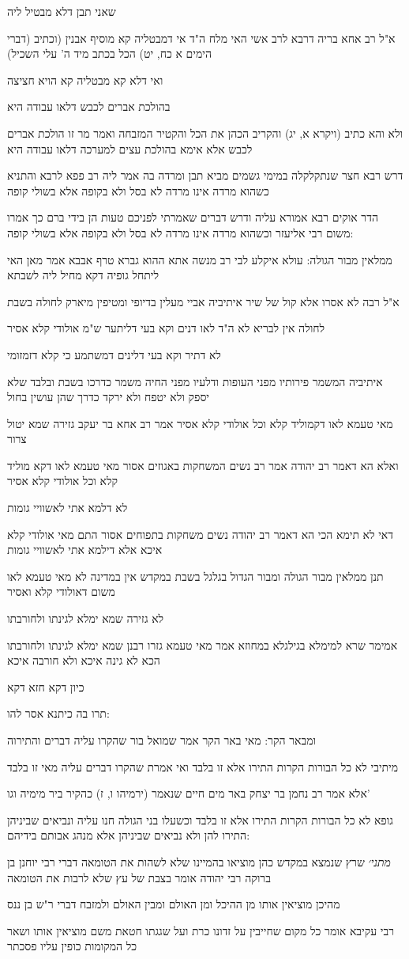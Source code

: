 \documentclass[12pt, openany]{book}
\newcommand{\sethebfont}{
\fontsize{10.5pt}{21.0pt} \selectfont
}
\newcommand{\textblock}[1]{
{\sethebfont #1\\}	
}
\begin{document}
\textblock{שאני תבן דלא מבטיל ליה}
\textblock{א"ל רב אחא בריה דרבא לרב אשי האי מלח ה"ד אי דמבטליה קא מוסיף אבנין (וכתיב (דברי הימים א כח, יט) הכל בכתב מיד ה' עלי השכיל)}
\textblock{ואי דלא קא מבטליה קא הויא חציצה}
\textblock{בהולכת אברים לכבש דלאו עבודה היא}
\textblock{ולא והא כתיב (ויקרא א, יג) והקריב הכהן את הכל והקטיר המזבחה ואמר מר זו הולכת אברים לכבש אלא אימא בהולכת עצים למערכה דלאו עבודה היא}
\textblock{דרש רבא חצר שנתקלקלה במימי גשמים מביא תבן ומרדה בה אמר ליה רב פפא לרבא והתניא כשהוא מרדה אינו מרדה לא בסל ולא בקופה אלא בשולי קופה}
\textblock{הדר אוקים רבא אמורא עליה ודרש דברים שאמרתי לפניכם טעות הן בידי ברם כך אמרו משום רבי אליעזר וכשהוא מרדה אינו מרדה לא בסל ולא בקופה אלא בשולי קופה:}
\textblock{ממלאין מבור הגולה: עולא איקלע לבי רב מנשה אתא ההוא גברא טרף אבבא אמר מאן האי ליתחל גופיה דקא מחיל ליה לשבתא}
\textblock{א"ל רבה לא אסרו אלא קול של שיר איתיביה אביי מעלין בדיופי ומטיפין מיארק לחולה בשבת}
\textblock{לחולה אין לבריא לא ה"ד לאו דנים וקא בעי דליתער ש"מ אולודי קלא אסיר}
\textblock{לא דתיר וקא בעי דלינים דמשתמע כי קלא דזמזומי}
\textblock{איתיביה המשמר פירותיו מפני העופות ודלעיו מפני החיה משמר כדרכו בשבת ובלבד שלא יספק ולא יטפח ולא ירקד כדרך שהן עושין בחול}
\textblock{מאי טעמא לאו דקמוליד קלא וכל אולודי קלא אסיר אמר רב אחא בר יעקב גזירה שמא יטול צרור}
\textblock{ואלא הא דאמר רב יהודה אמר רב נשים המשחקות באגוזים אסור מאי טעמא לאו דקא מוליד קלא וכל אולודי קלא אסיר}
\textblock{לא דלמא אתי לאשוויי גומות}
\textblock{דאי לא תימא הכי הא דאמר רב יהודה נשים משחקות בתפוחים אסור התם מאי אולודי קלא איכא אלא דילמא אתי לאשוויי גומות}
\textblock{תנן ממלאין מבור הגולה ומבור הגדול בגלגל בשבת במקדש אין במדינה לא מאי טעמא לאו משום דאולודי קלא ואסיר}
\textblock{לא גזירה שמא ימלא לגינתו ולחורבתו}
\textblock{אמימר שרא למימלא בגילגלא במחוזא אמר מאי טעמא גזרו רבנן שמא ימלא לגינתו ולחורבתו הכא לא גינה איכא ולא חורבה איכא}
\textblock{כיון דקא חזא דקא}
\textblock{תרו בה כיתנא אסר להו:}
\textblock{ומבאר הקר: מאי באר הקר אמר שמואל בור שהקרו עליה דברים והתירוה}
\textblock{מיתיבי לא כל הבורות הקרות התירו אלא זו בלבד ואי אמרת שהקרו דברים עליה מאי זו בלבד}
\textblock{אלא אמר רב נחמן בר יצחק באר מים חיים שנאמר (ירמיהו ו, ז) כהקיר ביר מימיה וגו'}
\textblock{גופא לא כל הבורות הקרות התירו אלא זו בלבד וכשעלו בני הגולה חנו עליה ונביאים שביניהן התירו להן ולא נביאים שביניהן אלא מנהג אבותם בידיהם:}
\textblock{{\large\emph{מתני׳}} שרץ שנמצא במקדש כהן מוציאו בהמיינו שלא לשהות את הטומאה דברי רבי יוחנן בן ברוקה רבי יהודה אומר בצבת של עץ שלא לרבות את הטומאה}
\textblock{מהיכן מוציאין אותו מן ההיכל ומן האולם ומבין האולם ולמזבח דברי ר"ש בן ננס}
\textblock{רבי עקיבא אומר כל מקום שחייבין על זדונו כרת ועל שגגתו חטאת משם מוציאין אותו ושאר כל המקומות כופין עליו פסכתר}
\end{document}
